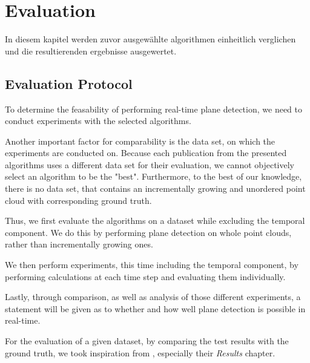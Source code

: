 \documentclass[main.tex]{subfiles}
\begin{document}
\chapter{Evaluation}

In diesem kapitel werden zuvor ausgewählte algorithmen einheitlich verglichen und die resultierenden ergebnisse ausgewertet.

\section{Evaluation Protocol}

To determine the feasability of performing real-time plane detection, we need to conduct experiments with the selected algorithms.

Another important factor for comparability is the data set, on which the experiments are conducted on.
Because each publication from the presented algorithms uses a different data set for their evaluation, we cannot objectively select an algorithm to be the "best".
Furthermore, to the best of our knowledge, there is no data set, that contains an incrementally growing and unordered point cloud with corresponding ground truth.

Thus, we first evaluate the algorithms on a dataset while excluding the temporal component. We do this by performing plane detection on whole point clouds, rather than
incrementally growing ones.

We then perform experiments, this time including the temporal component, by performing calculations at each time step and evaluating them individually.

Lastly, through comparison, as well as analysis of those different experiments, a statement will be given as to whether and how well plane detection is
possible in real-time.

For the evaluation of a given dataset, by comparing the test results with the ground truth, we took inspiration from \citeauthor{Araújo_Oliveira_2020},
especially their \textit{Results} chapter.
\end{document}
